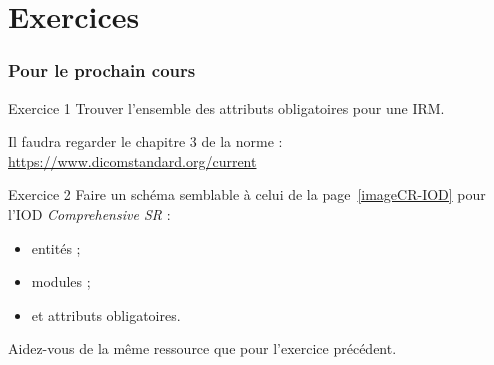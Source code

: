 \section{Exercices}

	\frame
	{
		\frametitle{Pour le prochain cours}
		
		{
			\begin{block}{Exercice 1}
				Trouver l'ensemble des attributs obligatoires pour une IRM.

				Il faudra regarder le chapitre 3 de la norme : \url{https://www.dicomstandard.org/current}
			\end{block}
		}

		{
			\begin{block}{Exercice 2}
				Faire un sch\'ema semblable \`a  celui de la page~\ref{imageCR-IOD} pour l'IOD \emph{Comprehensive SR} :
				\begin{itemize}
					\item entit\'es ;
					\item modules ;
					\item et attributs obligatoires.
				\end{itemize}

				Aidez-vous de la m\^eme ressource que pour l'exercice pr\'ec\'edent.
			\end{block}
		}
	}
